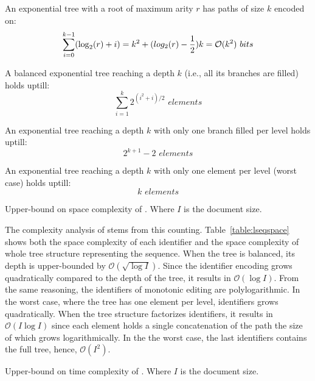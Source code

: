 \begin{asparadesc}
  An exponential tree with a root of maximum arity $r$ has paths of size $k$
  encoded on:
  \begin{equation}
    \sum\limits_{i=0}^{k-1}(\log_2(r)+i) =k^2+(log_2(r)-{1\over{2}})k =
    \mathcal{O}(k^2) \,\, bits
  \end{equation}

  A balanced exponential tree reaching a depth $k$ (i.e., all its branches are
  filled) holds uptill:
  \begin{equation}
    \sum\limits_{i=1}^{k} {2^{(i^2+i)/2}} \,\, elements
  \end{equation}

  An exponential tree reaching a depth $k$ with only one branch filled per level
  holds uptill:
  \begin{equation}
    2^{k+1}-2 \,\, elements
  \end{equation}

  An exponential tree reaching a depth $k$ with only one element per level
  (worst case) holds uptill: 
  \begin{equation}
    k \,\, elements
  \end{equation}

  \begin{table}
    \centering
    
    \caption{\label{table:lseqspace}
      Upper-bound on space complexity of \LSEQ. Where $I$ is the document size.}
  \end{table}
  
\item [The complexity analysis of \LSEQ] stems from this
  counting. Table~\ref{table:lseqspace} shows both the space complexity of each
  identifier and the space complexity of whole tree structure representing the
  sequence. When the tree is balanced, its depth is upper-bounded by
  $\mathcal{O}(\sqrt{\log I})$. Since the identifier encoding grows
  quadratically compared to the depth of the tree, it results in
  $\mathcal{O}(\log I)$. From the same reasoning, the identifiers of monotonic
  editing are polylogarithmic. In the worst case, where the tree has one element
  per level, identifiers grows quadratically. When the tree structure factorizes
  identifiers, it results in $\mathcal{O}(I\log I)$ since each element holds a
  single concatenation of the path the size of which grows logarithmically.  In
  the the worst case, the last identifiers contains the full tree, hence,
  $\mathcal{O}(I^2)$.

  \begin{table}
    \centering
    
    \caption{\label{table:lseqtime}
      Upper-bound on time complexity of \LSEQ. Where $I$ is the document size.}
  \end{table}
  

\end{asparadesc}

